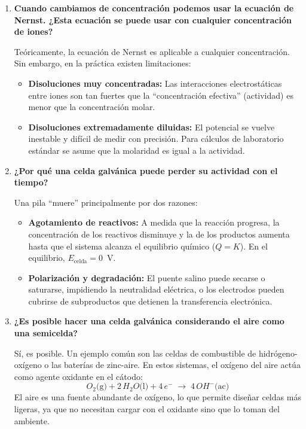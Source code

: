 \documentclass[12pt]{article}
\begin{document}
\begin{enumerate}[label=\textbf{P\arabic*.}, leftmargin=1.2cm]
    \item \textbf{Cuando cambiamos de concentración podemos usar la ecuación
          de Nernst. ¿Esta ecuación se puede usar con cualquier concentración
          de iones?}

    Teóricamente, la ecuación de Nernst es aplicable a cualquier
    concentración. Sin embargo, en la práctica existen limitaciones:

    \begin{itemize}[leftmargin=1cm]
        \item \textbf{Disoluciones muy concentradas:} Las interacciones
              electrostáticas entre iones son tan fuertes que la
              ``concentración efectiva'' (actividad) es menor que la
              concentración molar.
        \item \textbf{Disoluciones extremadamente diluidas:} El potencial
              se vuelve inestable y difícil de medir con precisión. Para
              cálculos de laboratorio estándar se asume que la molaridad es
              igual a la actividad.
    \end{itemize}

    \item \textbf{¿Por qué una celda galvánica puede perder su actividad con
          el tiempo?}

    Una pila ``muere'' principalmente por dos razones:

    \begin{itemize}[leftmargin=1cm]
        \item \textbf{Agotamiento de reactivos:} A medida que la reacción
              progresa, la concentración de los reactivos disminuye y la de
              los productos aumenta hasta que el sistema alcanza el
              equilibrio químico ($Q = K$). En el equilibrio,
              $E_{\text{celda}} = 0$~V.
        \item \textbf{Polarización y degradación:} El puente salino puede
              secarse o saturarse, impidiendo la neutralidad eléctrica, o los
              electrodos pueden cubrirse de subproductos que detienen la
              transferencia electrónica.
    \end{itemize}

    \item \textbf{¿Es posible hacer una celda galvánica considerando el aire
          como una semicelda?}

    Sí, es posible. Un ejemplo común son las celdas de combustible de
    hidrógeno-oxígeno o las baterías de zinc-aire. En estos sistemas, el
    oxígeno del aire actúa como agente oxidante en el cátodo:
    \[
        O_2\text{(g)} + 2\,H_2O\text{(l)} + 4\,e^- \;\to\; 4\,OH^-\text{(ac)}
    \]
    El aire es una fuente abundante de oxígeno, lo que permite diseñar celdas
    más ligeras, ya que no necesitan cargar con el oxidante sino que lo toman
    del ambiente.

\end{enumerate}
\end{document}
